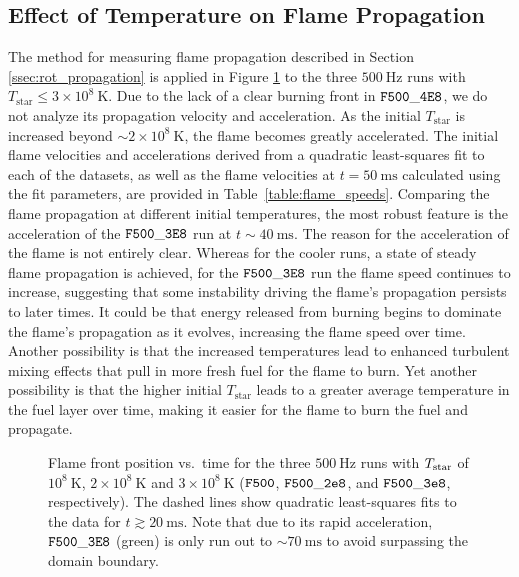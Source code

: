 \documentclass[preprint,times,tighten]{aastex63}
\begin{document}
\subsection{Effect of Temperature on Flame Propagation}\label{ssec:temp_prop}

The method for measuring flame propagation described in Section \ref{ssec:rot_propagation} is 
applied in Figure \ref{fig:flame_speeds_2} to the three $500~\mathrm{Hz}$ runs with 
$T_{\mathrm{star}} \leq 3 \times 10^8~\mathrm{K}$. Due to the lack of a clear burning front in 
$\tt{F500\_4E8}$, we do not analyze its propagation velocity and acceleration. As the initial 
$T_{\mathrm{star}}$ is increased beyond $\sim 2\times 10^8~\mathrm{K}$, the flame becomes greatly accelerated. The initial flame 
velocities and accelerations derived from a quadratic least-squares fit to each of the datasets, as 
well as the flame velocities at $t = 50~\mathrm{ms}$ calculated using the fit parameters, are 
provided in Table~\ref{table:flame_speeds}. Comparing the flame propagation at different initial 
temperatures, the most robust feature is the acceleration of the $\tt{F500\_3E8}$ run at $t \sim 
40~\mathrm{ms}$. The reason for the acceleration of the flame is not entirely clear. 
Whereas for the cooler runs, a state of steady flame propagation is achieved, for the $\tt{F500\_3E8}$ run
the flame speed continues to increase, suggesting that some instability driving the 
flame's propagation persists to later times. It could be 
that energy released from burning begins to dominate the flame's propagation as it evolves, 
increasing the flame speed over time. Another possibility is that the increased temperatures lead 
to enhanced turbulent mixing effects that pull in more fresh fuel for the flame to burn. Yet 
another possibility is that the higher initial $T_{\mathrm{star}}$ leads to a greater average 
temperature in the fuel layer over time, making it easier for the flame to burn the fuel and 
propagate. 


\begin{figure}[t]
	\centering
	\caption{\label{fig:flame_speeds_2} Flame front position vs.\ time for the three $500~\mathrm{Hz}$ runs with
		$T_{\rm star}$ of $10^8~\mathrm{K}$, $2\times10^8~\mathrm{K}$ and $3\times10^8~\mathrm{K}$ ($\tt{F500}$, $\tt{F500\_2e8}$, and $\tt{F500\_3e8}$, respectively). The dashed lines show quadratic least-squares fits to the data
		for $t \gtrsim 20~\mathrm{ms}$. Note that due to its rapid acceleration, $\tt{F500\_3E8}$ 
		(green) is only run out to $\sim 70~\mathrm{ms}$ to avoid surpassing the domain boundary.}
\end{figure}
\end{document}
